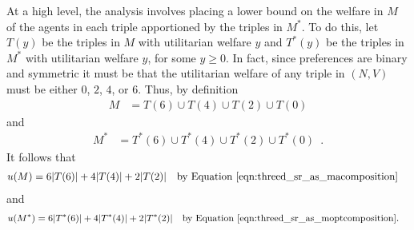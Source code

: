 At a high level, the analysis involves placing a lower bound on the welfare in $M$ of the agents in each triple apportioned by the triples in $M^*$. To do this, let $T(y)$ be the triples in $M$ with utilitarian welfare $y$ and $T^*(y)$ be the triples in $M^*$ with utilitarian welfare $y$, for some $y \geq 0$. In fact, since preferences are binary and symmetric it must be that the utilitarian welfare of any triple in $(N, V)$ must be either $0$, $2$, $4$, or $6$. Thus, by definition
\begin{align}
M &= T(6) \cup T(4) \cup T(2) \cup T(0)\label{eqn:threed_sr_as_macomposition}
\end{align}
and
\begin{align}
M^* &= T^*(6) \cup T^*(4) \cup T^*(2) \cup T^*(0)\label{eqn:threed_sr_as_moptcomposition}\enspace.
\end{align}
It follows that
\begin{align}
    u(M) &= 6|T(6)| + 4|T(4)| + 2|T(2)|\label{eqn:threed_sr_as_bwelfareofma} && \mbox{by Equation~\ref{eqn:threed_sr_as_macomposition}} 
\end{align}
and
\begin{align}
    u(M^*) &= 6|T^*(6)| + 4|T^*(4)| + 2|T^*(2)| && \mbox{by Equation~\ref{eqn:threed_sr_as_moptcomposition}.} \label{eqn:threed_sr_as_welfareofmopt}
\end{align}

